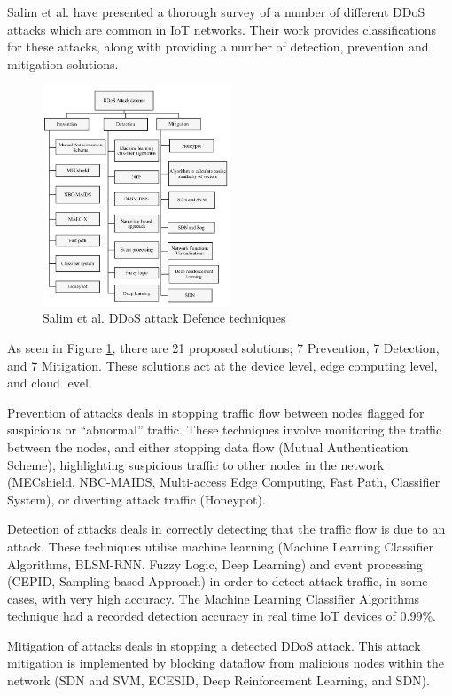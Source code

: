 Salim et al.\cite{Salim2019} have presented a thorough survey of a number of different DDoS
attacks which are common in IoT networks. Their work provides classifications
for these attacks, along with providing a number of detection, prevention and
mitigation solutions.

\begin{figure}[H]
	\centering
	\includegraphics[width=0.5\textwidth]{images/salimDefenseDiagram.png}
	\caption{Salim et al. DDoS attack Defence techniques\cite{Salim2019}}
	\label{fig:salimDefense}
\end{figure}

As seen in Figure \ref{fig:salimDefense}, there are 21 proposed solutions; 7
Prevention, 7 Detection, and 7 Mitigation. These solutions act at the device
level, edge computing level, and cloud level.

Prevention of attacks deals in stopping traffic flow between nodes flagged for
suspicious or ``abnormal'' traffic. These techniques involve
monitoring the traffic between the nodes, and either stopping data flow (Mutual
Authentication Scheme), highlighting suspicious traffic to other nodes in the
network (MECshield, NBC-MAIDS, Multi-access Edge Computing, Fast Path,
Classifier System), or diverting attack traffic (Honeypot).

Detection of attacks deals in correctly detecting that the traffic flow is due
to an attack. These techniques utilise machine learning (Machine Learning
Classifier Algorithms, BLSM-RNN, Fuzzy Logic, Deep Learning) and event processing
(CEPID, Sampling-based Approach) in order to detect attack traffic, in some
cases, with very high accuracy. The Machine Learning Classifier Algorithms
technique had a recorded detection accuracy in real time IoT devices of 0.99\%.

Mitigation of attacks deals in stopping a detected DDoS attack. This attack
mitigation is implemented by blocking dataflow from malicious nodes within the
network (SDN and SVM, ECESID, Deep Reinforcement Learning, and SDN).
